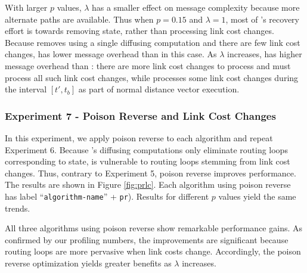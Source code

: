 With larger $p$ values, $\lambda$ has a smaller effect on message complexity because more alternate paths are available. Thus when $p=0.15$ and $\lambda=1$,
most of \purges's recovery effort is towards removing \badvector state, rather than processing link cost changes.  Because
\cpr removes \badvector using a single diffusing computation and there are few link cost changes, \cpr has lower message overhead than \purge in this case. 
As $\lambda$ increases, \cpr has higher message overhead than \purges: there are more link cost changes to process and \cpr must process all such link cost changes, 
while \purge processes some link cost changes during the interval $[t',t_b]$ as part of normal distance vector execution. 

\subsubsection{Experiment 7 - Poison Reverse and Link Cost Changes}
In this experiment, we apply poison reverse to each algorithm and repeat Experiment 6. Because \purges's diffusing computations only eliminate routing loops corresponding 
to \badvector state, \purge is vulnerable to routing loops stemming from link cost changes.  Thus, contrary to Experiment 5, poison reverse improves \purge performance.
The results are shown in Figure \ref{fig:prlc}. Each algorithm using poison reverse has label ``{\tt algorithm-name}'' + {\tt pr}).
Results for different $p$ values yield the same trends. 

All three algorithms using poison reverse show remarkable performance gains.
As confirmed by our profiling numbers, the improvements are significant because routing loops are more pervasive when link costs change.  
Accordingly, the poison reverse optimization yields greater benefits as $\lambda$ increases. %

